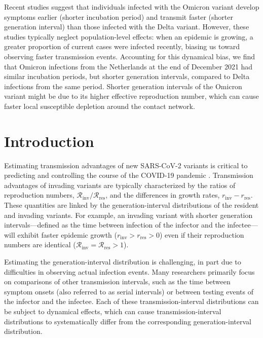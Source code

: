 \documentclass[12pt]{article}
\newcommand{\Rx}[1]{\ensuremath{{\mathcal R}_{#1}}\xspace}
\newcommand{\Rres}{\Rx{\mathrm{res}}}
\newcommand{\Rinv}{\Rx{\mathrm{inv}}}
\newcommand{\rx}[1]{\ensuremath{{r}_{#1}}\xspace}
\newcommand{\rres}{\rx{\mathrm{res}}}
\newcommand{\rinv}{\rx{\mathrm{inv}}}
\begin{document}
\begin{flushleft}{
	\Large
	\textbf{}
}
Recent studies suggest that individuals infected with the Omicron variant develop symptoms earlier (shorter incubation period) and transmit faster (shorter generation interval) than those infected with the Delta variant.
However, these studies typically neglect population-level effects: 
when an epidemic is growing, a greater proportion of current cases were infected recently, biasing us toward observing faster transmission events.
Accounting for this dynamical bias, we find that Omicron infections from the Netherlands at the end of December 2021 had similar incubation periods, but shorter generation intervals, compared to Delta infections from the same period.
Shorter generation intervals of the Omicron variant might be due to its higher effective reproduction number, which can cause faster local susceptible depletion around the contact network.

\end{flushleft}

\pagebreak

\section{Introduction}

Estimating transmission advantages of new SARS-CoV-2 variants is critical to predicting and controlling the course of the COVID-19 pandemic \citep{park2021roles}.
Transmission advantages of invading variants are typically characterized by the ratios of reproduction numbers, $\Rinv/\Rres$, and the differences in growth rates, $\rinv-\rres$.
These quantities are linked by the generation-interval distributions of the resident and invading variants.
For example, an invading variant with shorter generation intervals---defined as the time between infection of the infector and the infectee---will exhibit faster epidemic growth ($\rinv > \rres > 0$) even if their reproduction numbers are identical ($\Rinv = \Rres > 1$).

Estimating the generation-interval distribution is challenging, in part due to difficulties in observing actual infection events.
Many researchers primarily focus on comparisons of other transmission intervals, such as the time between symptom onsets (also referred to as serial intervals) or between testing events \citep{abbott2022test} of the infector and the infectee.
Each of these transmission-interval distributions can be subject to dynamical effects, which can cause transmission-interval distributions to systematically differ from the corresponding generation-interval distribution.
\end{document}
